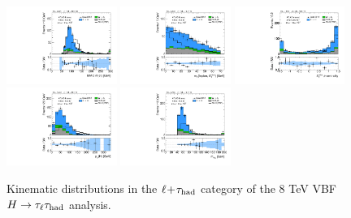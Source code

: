 \begin{figure}[tp]
  \includegraphics[width=0.32\textwidth]{figures/vbf-LTT/mMMC}
  \includegraphics[width=0.32\textwidth]{figures/vbf-LTT/mT}
  \includegraphics[width=0.32\textwidth]{figures/vbf-LTT/met-phi-centrality}
  \includegraphics[width=0.32\textwidth]{figures/vbf-LTT/H-pt-hi}
  \includegraphics[width=0.32\textwidth]{figures/vbf-LTT/mvis}
  \caption{Kinematic distributions in the $\ell\!+\!\tau_\text{had}$ category of the 8 TeV VBF $H\rightarrow\tau_\ell\tau_\text{had}$ analysis.}
  \label{fig:prospects-ltt-taus}
\end{figure}

